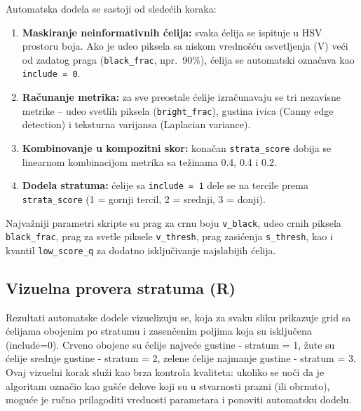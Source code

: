 \documentclass[a4paper,12pt]{article}
\begin{document}
\noindent
Automatska dodela se sastoji od sledećih koraka:
\begin{enumerate}
  \item \textbf{Maskiranje neinformativnih ćelija:} svaka ćelija se ispituje u HSV prostoru boja. Ako je udeo piksela sa niskom vrednošću osvetljenja (V) veći od zadatog praga (\texttt{black\_frac}, npr.\ 90\%), ćelija se automatski označava kao \texttt{include = 0}.
  \item \textbf{Računanje metrika:} za sve preostale ćelije izračunavaju se tri nezavisne metrike – udeo svetlih piksela (\texttt{bright\_frac}), gustina ivica (Canny edge detection) i teksturna varijansa (Laplacian variance).
  \item \textbf{Kombinovanje u kompozitni skor:} konačan \texttt{strata\_score} dobija se linearnom kombinacijom metrika sa težinama 0.4, 0.4 i 0.2.
  \item \textbf{Dodela stratuma:} ćelije sa \texttt{include = 1} dele se na tercile prema \texttt{strata\_score} (1 = gornji tercil, 2 = srednji, 3 = donji).
\end{enumerate}

\noindent
Najvažniji parametri skripte su prag za crnu boju \texttt{v\_black}, udeo crnih piksela \texttt{black\_frac}, prag za svetle piksele \texttt{v\_thresh}, prag zasićenja \texttt{s\_thresh}, kao i kvantil \texttt{low\_score\_q} za dodatno isključivanje najslabijih ćelija.

\subsection{Vizuelna provera stratuma (R)}

Rezultati automatske dodele vizuelizuju se, koja za svaku sliku prikazuje grid sa ćelijama obojenim po stratumu i zasenčenim poljima koja su isključena (include=0).
Crveno obojene su ćelije najveće gustine - stratum = 1, žute su ćelije srednje gustine - stratum = 2, zelene ćelije najmanje gustine - stratum = 3.
\newline
\noindent
Ovaj vizuelni korak služi kao brza kontrola kvaliteta: ukoliko se uoči da je algoritam označio kao gušće delove koji su u stvarnosti prazni (ili obrnuto), moguće je ručno prilagoditi vrednosti parametara i ponoviti automatsku dodelu.
\end{document}
